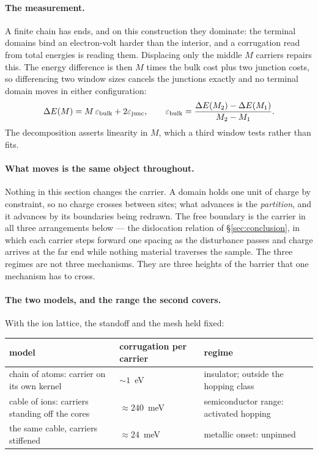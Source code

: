 \documentclass[11pt]{article}
\begin{document}
\paragraph{The measurement.} A finite chain has ends, and on this construction they dominate: the
terminal domains bind an electron-volt harder than the interior, and a corrugation read from total
energies is reading them. Displacing only the middle $M$ carriers repairs this. The energy difference
is then $M$ times the bulk cost plus two junction costs, so differencing two window sizes cancels the
junctions exactly and no terminal domain moves in either configuration:
\begin{equation}\label{eq:window}
\Delta E(M) = M\,\varepsilon_{\rm bulk} + 2\varepsilon_{\rm junc},
\qquad
\varepsilon_{\rm bulk} = \frac{\Delta E(M_2)-\Delta E(M_1)}{M_2-M_1}.
\end{equation}
The decomposition asserts linearity in $M$, which a third window tests rather than fits.

\paragraph{What moves is the same object throughout.} Nothing in this section changes the carrier.
A domain holds one unit of charge by constraint, so no charge crosses between sites; what advances is
the \emph{partition}, and it advances by its boundaries being redrawn. The free boundary is the
carrier in all three arrangements below --- the dislocation relation of \S\ref{sec:conclusion}, in
which each carrier steps forward one spacing as the disturbance passes and charge arrives at the far
end while nothing material traverses the sample. The three regimes are not three mechanisms. They are
three heights of the barrier that one mechanism has to cross.

\paragraph{The two models, and the range the second covers.} With the ion lattice, the standoff and
the mesh held fixed:
\begin{center}
\small
\begin{tabular}{@{}lll@{}}
\toprule
model & corrugation per carrier & regime\\
\midrule
chain of atoms: carrier on its own kernel & ${\sim}1$~eV & insulator; outside the hopping class\\
cable of ions: carriers standing off the cores & ${\approx}240$~meV & semiconductor range: activated hopping\\
\quad the same cable, carriers stiffened & ${\approx}24$~meV & metallic onset: unpinned\\
\bottomrule
\end{tabular}
\end{center}
\end{document}
